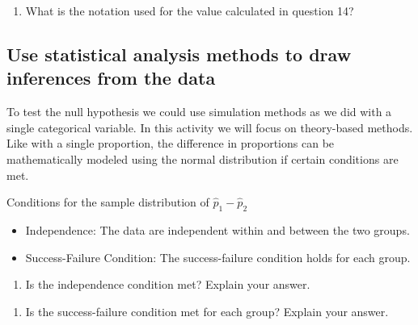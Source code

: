 \documentclass[
]{report}
\providecommand{\tightlist}{%
  \setlength{\itemsep}{0pt}\setlength{\parskip}{0pt}}
\begin{document}
\begin{enumerate}
\def\labelenumi{\arabic{enumi}.}
\setcounter{enumi}{14}
\tightlist
\item
  What is the notation used for the value calculated in question 14?
\end{enumerate}

\vspace{0.5in}

\hypertarget{use-statistical-analysis-methods-to-draw-inferences-from-the-data}{%
\subsection{Use statistical analysis methods to draw inferences from the data}\label{use-statistical-analysis-methods-to-draw-inferences-from-the-data}}

To test the null hypothesis we could use simulation methods as we did with a single categorical variable. In this activity we will focus on theory-based methods. Like with a single proportion, the difference in proportions can be mathematically modeled using the normal distribution if certain conditions are met.

Conditions for the sample distribution of \(\hat{p}_1-\hat{p}_2\)

\begin{itemize}
\item
  Independence: The data are independent within and between the two groups.
\item
  Success-Failure Condition: The success-failure condition holds for each group.
\end{itemize}

\vspace{.25in}

\begin{enumerate}
\def\labelenumi{\arabic{enumi}.}
\setcounter{enumi}{15}
\tightlist
\item
  Is the independence condition met? Explain your answer.
\end{enumerate}

\vspace{1in}

\begin{enumerate}
\def\labelenumi{\arabic{enumi}.}
\setcounter{enumi}{16}
\tightlist
\item
  Is the success-failure condition met for each group? Explain your answer.
\end{enumerate}

\vspace{1in}
\end{document}
